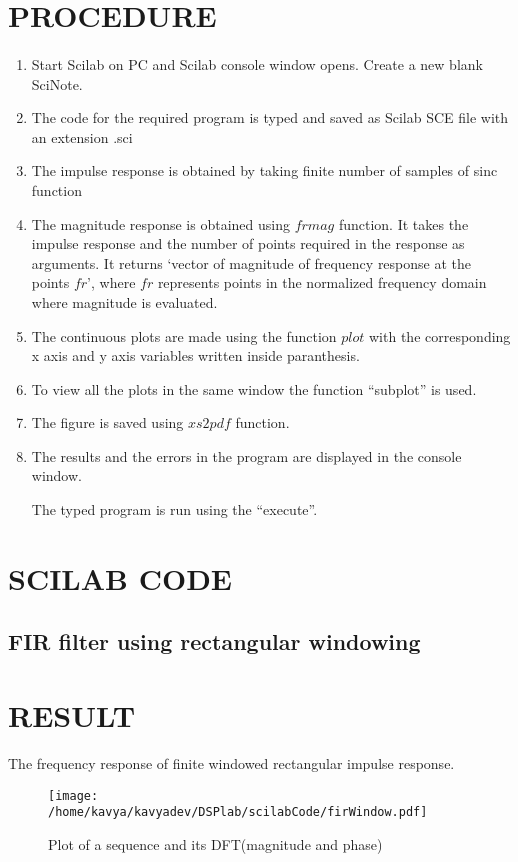 \section{PROCEDURE}

\paragraph{}
\begin{enumerate}
\item
Start Scilab on PC and Scilab console window opens. Create a new blank SciNote.
\item
The code for the required program is typed and saved as Scilab SCE file with an extension .sci
\item
The impulse response is obtained by taking finite number of samples of sinc function
\item
The magnitude response is obtained using  $frmag$ function. It takes the impulse response and the number of points required in the response as arguments. It returns `vector of magnitude of frequency response at the points $fr$', where $fr$ represents points in the normalized frequency domain where magnitude is evaluated.
\item
The continuous plots are made using the function $plot$ with the corresponding x axis and y axis variables written inside paranthesis.

\item
To view all the plots in the same window the function “subplot” is used.
\item
The figure is saved using $xs2pdf$ function.
\item
The results and the errors in the program are displayed in the console window.

The typed program is run using the “execute”.
\end{enumerate}

\section{SCILAB CODE}
\subsection{FIR filter using rectangular windowing}





\section{RESULT}
The frequency response of finite windowed rectangular impulse response.

\begin{figure}
\texttt{[image: /home/kavya/kavyadev/DSPlab/scilabCode/firWindow.pdf]}
\caption{Plot of a sequence and its DFT(magnitude and phase)}
\label{dft_sequence}
\end{figure}
